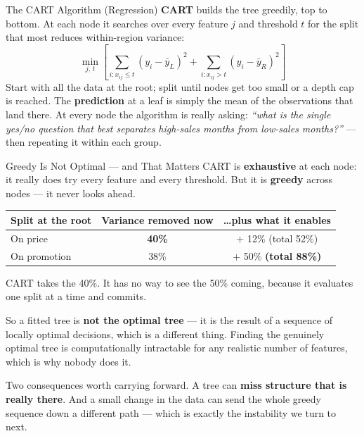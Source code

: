 \documentclass[aspectratio=169, 11pt]{beamer}
\begin{document}
\begin{frame}{The CART Algorithm (Regression) \parencite{Breiman1984}}
  \textbf{CART} builds the tree greedily, top to bottom. At each node it
  searches over every feature $j$ and threshold $t$ for the split that most
  reduces within-region variance:
  \[
    \min_{j,\, t}
    \left[
      \sum_{i: x_{ij} \leq t} (y_i - \bar{y}_{L})^2
      +
      \sum_{i: x_{ij} > t} (y_i - \bar{y}_{R})^2
    \right]
  \]
  Start with all the data at the root; split until nodes get too small or a
  depth cap is reached. The \textbf{prediction} at a leaf is simply the mean
  of the observations that land there.
  At every node the algorithm is really asking: \emph{``what is the single
  yes/no question that best separates high-sales months from low-sales
  months?''} --- then repeating it within each group.
\end{frame}

\begin{frame}{Greedy Is Not Optimal --- and That Matters}
  CART is \textbf{exhaustive} at each node: it really does try every feature and every
  threshold. But it is \textbf{greedy} across nodes --- it never looks ahead.
  \begin{center}
    {\small
    \begin{tabular}{lcc}
      \toprule
      \textbf{Split at the root} & \textbf{Variance removed now} & \textbf{\ldots plus what it enables} \\
      \midrule
      On price     & \textbf{40\%} & $+$ 12\% \quad (total 52\%) \\
      On promotion & 38\%          & $+$ 50\% \quad \textbf{(total 88\%)} \\
      \bottomrule
    \end{tabular}
    }
  \end{center}
  \vspace{-0.1cm}
  CART takes the 40\%. It has no way to see the 50\% coming, because it evaluates one split at
  a time and commits.

  \vspace{0.15cm}
  So a fitted tree is \textbf{not the optimal tree} --- it is the result of a sequence of
  locally optimal decisions, which is a different thing. Finding the genuinely optimal tree is
  computationally intractable for any realistic number of features, which is why nobody does it.

  \vspace{0.15cm}
  Two consequences worth carrying forward. A tree can \textbf{miss structure that is really
  there}. And a small change in the data can send the whole greedy sequence down a different
  path --- which is exactly the instability we turn to next.
\end{frame}
\end{document}
